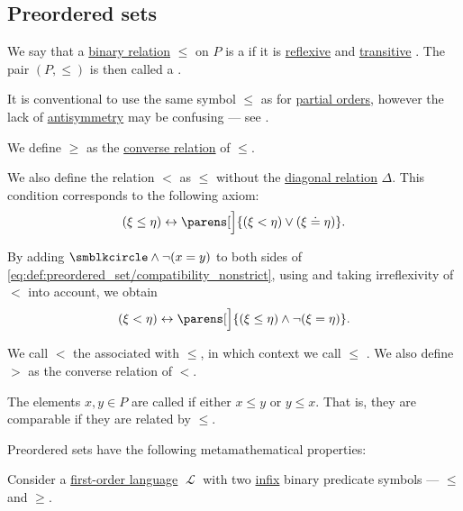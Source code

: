 \subsection{Preordered sets}\label{subsec:preordered_sets}

\begin{definition}\label{def:preordered_set}
  We say that a \hyperref[def:binary_relation]{binary relation} \( \leq \) on \( P \) is a  if it is \hyperref[def:binary_relation/reflexive]{reflexive} and \hyperref[def:binary_relation/transitive]{transitive} . The pair \( (P, \leq) \) is then called a .

  It is conventional to use the same symbol \( \leq \) as for \hyperref[def:partially_ordered_set]{partial orders}, however the lack of \hyperref[def:binary_relation/antisymmetric]{antisymmetry} may be confusing --- see .

  We define \( \geq \) as the \hyperref[def:binary_relation/converse]{converse relation} of \( \leq \).

  We also define the relation \( < \) as \( \leq \) without the \hyperref[def:binary_relation/diagonal]{diagonal relation} \( \Delta \). This condition corresponds to the following axiom:
  \begin{equation}\label{eq:def:preordered_set/compatibility_nonstrict}
    (\xi \leq \eta) \leftrightarrow \parens[\Big]{(\xi < \eta) \vee (\xi \doteq \eta)}.
  \end{equation}

  By adding \( \anon \wedge \neg (x = y) \) to both sides of \eqref{eq:def:preordered_set/compatibility_nonstrict}, using  and taking irreflexivity of \( < \) into account, we obtain
  \begin{equation}\label{eq:def:preordered_set/compatibility_strict}
    (\xi < \eta) \leftrightarrow \parens[\Big]{(\xi \leq \eta) \wedge \neg (\xi = \eta)}.
  \end{equation}

  We call \( < \) the  associated with \( \leq \), in which context we call \( \leq \) . We also define \( > \) as the converse relation of \( < \).

  The elements \( x, y \in P \) are called  if either \( x \leq y \) or \( y \leq x \). That is, they are comparable if they are related by \( \leq \).

  Preordered sets have the following metamathematical properties:
  \begin{thmenum}
     Consider a \hyperref[def:first_order_language]{first-order language} \( \mscrL \) with two \hyperref[rem:first_order_formula_conventions/infix]{infix} binary predicate symbols --- \( \leq \) and \( \geq \).


\end{thmenum}
\end{definition}
